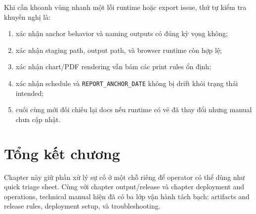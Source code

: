 Khi cần khoanh vùng nhanh một lỗi runtime hoặc export issue, thứ tự kiểm tra khuyến nghị là:

\begin{enumerate}[label=-]
\item xác nhận anchor behavior và naming outputs có đúng kỳ vọng không;
\item xác nhận staging path, output path, và browser runtime còn hợp lệ;
\item xác nhận chart/PDF rendering vẫn bám các print rules ổn định;
\item xác nhận schedule và \texttt{REPORT\_ANCHOR\_DATE} không bị drift khỏi trạng thái intended;
\item cuối cùng mới đối chiếu lại docs nếu runtime có vẻ đã thay đổi nhưng manual chưa cập nhật.
\end{enumerate}

\section{Tổng kết chương}

Chapter này giữ phần xử lý sự cố ở một chỗ riêng để operator có thể dùng như quick triage sheet. Cùng với chapter output/release và chapter deployment and operations, technical manual hiện đã có ba lớp vận hành tách bạch: artifacts and release rules, deployment setup, và troubleshooting.
